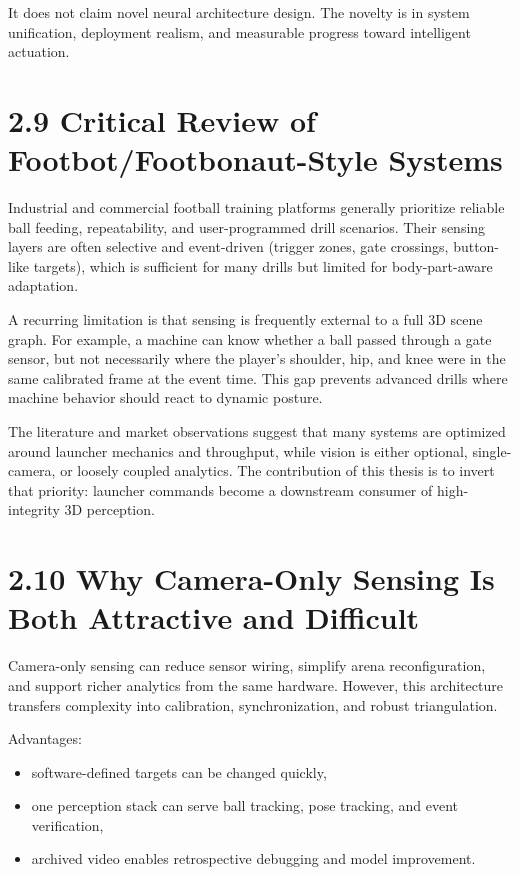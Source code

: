 It does not claim novel neural architecture design. The novelty is in system unification, deployment realism, and measurable progress toward intelligent actuation.


\section{2.9 Critical Review of Footbot/Footbonaut-Style Systems}
Industrial and commercial football training platforms generally prioritize reliable ball feeding, repeatability, and user-programmed drill scenarios. Their sensing layers are often selective and event-driven (trigger zones, gate crossings, button-like targets), which is sufficient for many drills but limited for body-part-aware adaptation.

A recurring limitation is that sensing is frequently external to a full 3D scene graph. For example, a machine can know whether a ball passed through a gate sensor, but not necessarily where the player's shoulder, hip, and knee were in the same calibrated frame at the event time. This gap prevents advanced drills where machine behavior should react to dynamic posture.

The literature and market observations suggest that many systems are optimized around launcher mechanics and throughput, while vision is either optional, single-camera, or loosely coupled analytics. The contribution of this thesis is to invert that priority: launcher commands become a downstream consumer of high-integrity 3D perception.

\section{2.10 Why Camera-Only Sensing Is Both Attractive and Difficult}
Camera-only sensing can reduce sensor wiring, simplify arena reconfiguration, and support richer analytics from the same hardware. However, this architecture transfers complexity into calibration, synchronization, and robust triangulation.

Advantages:
\begin{itemize}
  \item software-defined targets can be changed quickly,
  \item one perception stack can serve ball tracking, pose tracking, and event verification,
  \item archived video enables retrospective debugging and model improvement.
\end{itemize}


